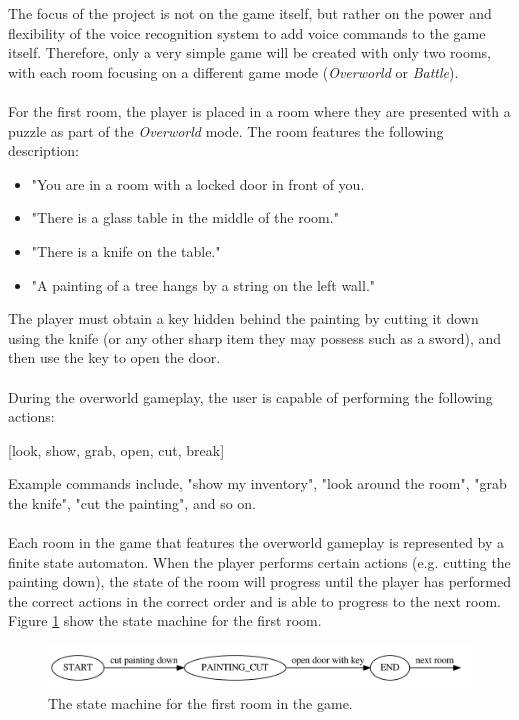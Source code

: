 \documentclass[11pt]{article}
\begin{document}
The focus of the project is not on the game itself, but rather on the power and flexibility of the voice recognition system to add voice commands to the game itself. Therefore, only a very simple game will be created with only two rooms, with each room focusing on a different game mode (\textit{Overworld} or \textit{Battle}).
\\
\\
For the first room, the player is placed in a room where they are presented with a puzzle as part of the \textit{Overworld} mode. The room features the following description:

\begin{itemize}
\item "You are in a room with a locked door in front of you.

\item "There is a glass table in the middle of the room."

\item "There is a knife on the table."

\item "A painting of a tree hangs by a string on the left wall."
\end{itemize}

The player must obtain a key hidden behind the painting by cutting it down using the knife (or any other sharp item they may possess such as a sword), and then use the key to open the door.
\\
\\
During the overworld gameplay, the user is capable of performing the following actions:

\begin{center}
[look, show, grab, open, cut, break]
\end{center}

Example commands include, "show my inventory", "look around the room", "grab the knife", "cut the painting", and so on.
\\
\\
Each room in the game that features the overworld gameplay is represented by a finite state automaton. When the player performs certain actions (e.g. cutting the painting down), the state of the room will progress until the player has performed the correct  actions in the correct order and is able to progress to the next room. Figure \ref{fig:room1-fsa} show the state machine for the first room.

\begin{center}
\begin{figure}[H]
\begin{center}
  \includegraphics[width=\linewidth]{room1-fsa.pdf}
  \caption{The state machine for the first room in the game.}
  \label{fig:room1-fsa}
  \end{center}
\end{figure}
\end{center}
\end{document}
